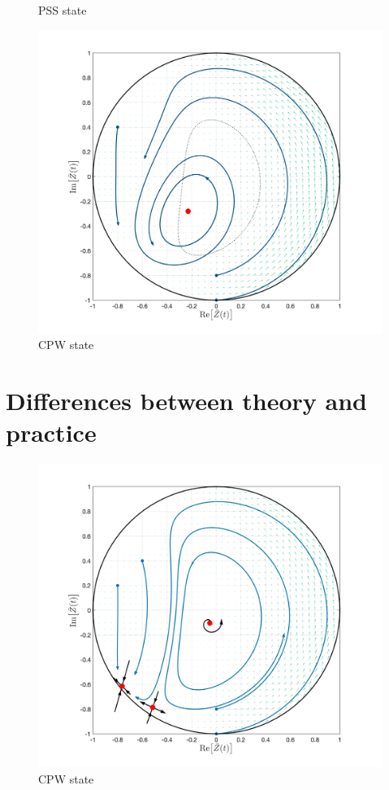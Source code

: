 \begin{figure}[H]
  \caption{PSS state}\label{fig:MFRPSS}
\endminipage\hfill
{}%
  \includegraphics[width=\linewidth, trim={2cm 1cm 2cm 1.5cm },clip]{../Figures/MFOARCPW_scalefree.png}
  \caption{CPW state}\label{fig:MFRCPW}
\endminipage
\end{figure}


\section{Differences between theory and practice}
\begin{figure}[H]
  \includegraphics[width=\linewidth]{../Figures/MFRCPW.png}
  \caption{CPW state}\label{fig:MFRCPW}
\end{figure}




